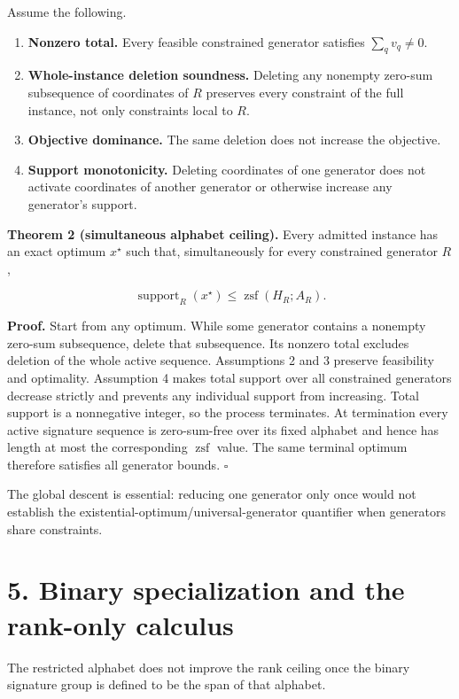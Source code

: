 \documentclass[11pt]{article}
\providecommand{\tightlist}{\setlength{\itemsep}{0pt}\setlength{\parskip}{0pt}}
\begin{document}
Assume the following.

\begin{enumerate}
\def\labelenumi{\arabic{enumi}.}
\tightlist
\item
  \textbf{Nonzero total.} Every feasible constrained generator satisfies \(\sum_q v_q\neq 0\).
\item
  \textbf{Whole-instance deletion soundness.} Deleting any nonempty zero-sum subsequence of coordinates of \(R\) preserves every constraint of the full instance, not only constraints local to \(R\).
\item
  \textbf{Objective dominance.} The same deletion does not increase the objective.
\item
  \textbf{Support monotonicity.} Deleting coordinates of one generator does not activate coordinates of another generator or otherwise increase any generator's support.
\end{enumerate}

\textbf{Theorem 2 (simultaneous alphabet ceiling).} Every admitted instance has an exact optimum \(x^\star\) such that, simultaneously for every constrained generator \(R\),

\[
\operatorname{support}_R(x^\star)
\leq
\operatorname{zsf}(H_R;A_R).
\]

\textbf{Proof.} Start from any optimum. While some generator contains a nonempty zero-sum subsequence, delete that subsequence. Its nonzero total excludes deletion of the whole active sequence. Assumptions 2 and 3 preserve feasibility and optimality. Assumption 4 makes total support over all constrained generators decrease strictly and prevents any individual support from increasing. Total support is a nonnegative integer, so the process terminates. At termination every active signature sequence is zero-sum-free over its fixed alphabet and hence has length at most the corresponding \(\operatorname{zsf}\) value. The same terminal optimum therefore satisfies all generator bounds. \(\square\)

The global descent is essential: reducing one generator only once would not establish the existential-optimum/universal-generator quantifier when generators share constraints.

\section*{5. Binary specialization and the rank-only calculus}\label{binary-specialization-and-the-rank-only-calculus}

The restricted alphabet does not improve the rank ceiling once the binary signature group is defined to be the span of that alphabet.
\end{document}
